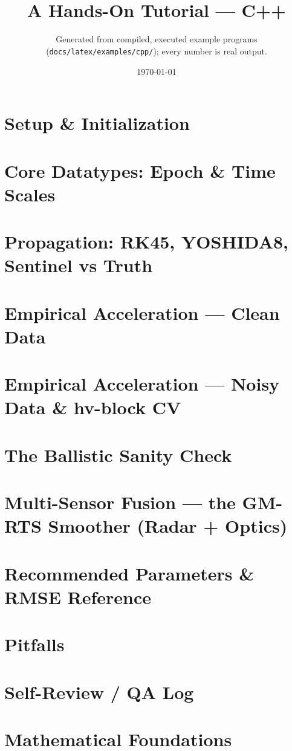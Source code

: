 \documentclass[11pt]{report}
\title{\Huge\Ballistic\\[4pt]\Large A Hands-On Tutorial — C++}
\author{Generated from compiled, executed example programs\\
  (\texttt{docs/latex/examples/cpp/}); every number is real output.}
\date{\today}
\begin{document}
\maketitle
\tableofcontents

\chapter{Setup \& Initialization}
\chapter{Core Datatypes: Epoch \& Time Scales}
\chapter{Propagation: RK45, YOSHIDA8, Sentinel vs Truth}
\chapter{Empirical Acceleration --- Clean Data}
\chapter{Empirical Acceleration --- Noisy Data \& hv-block CV}
\chapter{The Ballistic Sanity Check}
\chapter{Multi-Sensor Fusion --- the GM-RTS Smoother (Radar + Optics)}
\chapter{Recommended Parameters \& RMSE Reference}
\chapter{Pitfalls}
\chapter{Self-Review / QA Log}
\chapter{Mathematical Foundations}

\end{document}
